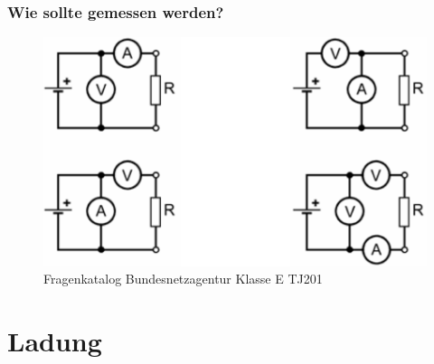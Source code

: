 \begin{frame}
  \frametitle{Wie sollte gemessen werden?}
  \begin{figure}
    \includegraphics[width=\textwidth,height=.75\textheight,keepaspectratio]{e02/stromSpannung.png}
    \caption{Fragenkatalog Bundesnetzagentur Klasse E TJ201}
  \end{figure}
\end{frame}

\section*{Ladung}

